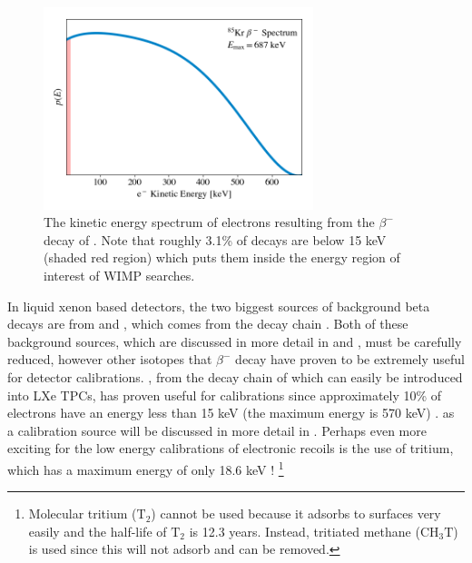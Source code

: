 \begin{figure}[t]
	\centering
	\includegraphics[width=0.7\textwidth]{kr85_beta_rates}
	\caption{The kinetic energy spectrum of electrons resulting from the $\beta^-$ decay of  \cite{mantel1972beta}.  Note that roughly 3.1\% of decays are below 15 keV (shaded red region) which puts them inside the energy region of interest of WIMP searches.}
	\label{fig:kr85_beta_decay}
\end{figure}


In liquid xenon based detectors, the two biggest sources of background beta decays are from  and , which comes from the  decay chain \cite{aprile2017first}.  Both of these background sources, which are discussed in more detail in  and ,  must be carefully reduced, however other isotopes that $\beta^-$ decay have proven to be extremely useful for detector calibrations.  , from the decay chain of  which can easily be introduced into LXe TPCs,  has proven useful for calibrations since approximately 10\% of electrons have an energy less than 15 keV (the maximum energy is 570 keV) \cite{aprile2017results}.   as a calibration source will be discussed in more detail in .  Perhaps even more exciting for the low energy calibrations of electronic recoils is the use of tritium, which has a maximum energy of only 18.6 keV \cite{akerib2016tritium, aprile2017tritium}! \footnote{Molecular tritium ($\textrm{T}_2$) cannot be used because it adsorbs to surfaces very easily and the half-life of $\textrm{T}_2$ is 12.3 years.  Instead, tritiated methane ($\textrm{CH}_3\textrm{T}$) is used since this will not adsorb and can be removed.}  

